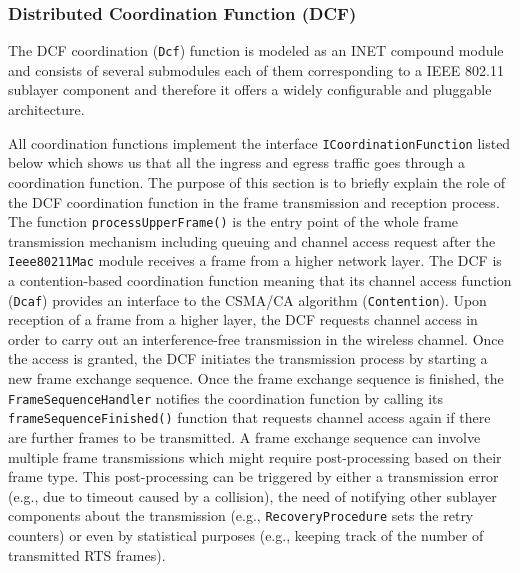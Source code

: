 %
\subsubsection{Distributed Coordination Function (DCF)}
%
The DCF coordination (\texttt{Dcf}) function is modeled as an INET compound module and consists of several submodules each of them corresponding to a IEEE 802.11 sublayer component and therefore it offers a widely configurable and pluggable architecture.

All coordination functions implement the interface \texttt{ICoordinationFunction} listed below which shows us that all the ingress and egress traffic goes through a coordination function. The purpose of this section is to briefly explain the role of the DCF coordination function in the frame transmission and reception process.
The function \texttt{processUpperFrame()} is the entry point of the whole frame transmission mechanism including queuing and channel access request after the \texttt{Ieee80211Mac} module receives a frame from a higher network layer.
The DCF is a contention-based coordination function meaning that its channel access function (\texttt{Dcaf}) provides an interface to the CSMA/CA algorithm (\texttt{Contention}). Upon reception of a frame from a higher layer, the DCF requests channel access in order to carry out an interference-free transmission in the wireless channel. Once the access is granted, the DCF initiates the transmission process by starting a new frame exchange sequence.
Once the frame exchange sequence is finished, the \texttt{FrameSequenceHandler} notifies the coordination function by calling its \texttt{frameSequenceFinished()} function that requests channel access again if there are further frames to be transmitted.
A frame exchange sequence can involve multiple frame transmissions which might require post-processing based on their frame type. This post-processing can be triggered by either a transmission error (e.g., due to timeout caused by a collision), the need of notifying other sublayer components about the transmission (e.g., \texttt{RecoveryProcedure} sets the retry counters) or even by statistical purposes (e.g., keeping track of the number of transmitted RTS frames).

